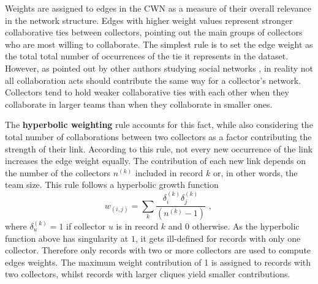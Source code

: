 Weights are assigned to edges in the CWN as a measure of their overall relevance in the network structure. Edges with higher weight values represent stronger collaborative ties between collectors, pointing out the main groups of collectors who are most willing to collaborate. 
The simplest rule is to set the edge weight as the total total number of occurrences of the tie it represents in the dataset. However, as pointed out by other authors studying social networks \cite{Newman2001a}, in reality not all collaboration acts should contribute the same way for a collector's network. 
Collectors tend to hold weaker collaborative ties with each other when they collaborate in larger teams than when they collaborate in smaller ones. 

The \textbf{hyperbolic weighting} rule accounts for this fact, while also considering the total number of collaborations between two collectors as a factor contributing the strength of their link.
According to this rule, not every new occurrence of the link increases the edge weight equally. 
The contribution of each new link depends on the number of the collectors $n^{(k)}$ included in record $k$ or, in other words, the team size. 
This rule follows a hyperbolic growth function 
\begin{equation}
w_{(i,j)} = \sum\limits_k \frac{\delta_i^{(k)} \delta_j^{(k)}}{(n^{(k)}-1)} \mbox{ , }
\end{equation}
where $\delta^{(k)}_u = 1$ if collector $u$ is in record $k$ and $0$ otherwise.
As the hyperbolic function above has singularity at $1$, it gets ill-defined for records with only one collector. 
Therefore only records with two or more collectors are used to compute edges weights. 
The maximum weight contribution of 1 is assigned to records with two collectors, whilst records with larger cliques yield smaller contributions.\\

